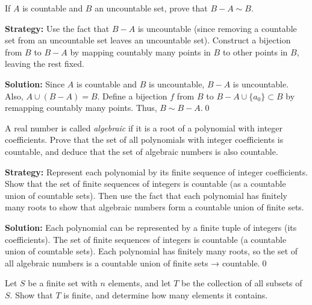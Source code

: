 \begin{problembox}
\begin{problemstatement}
If \( A \) is countable and \( B \) an uncountable set, prove that \( B - A \sim B \).
\end{problemstatement}
\end{problembox}

\noindent\textbf{Strategy:} Use the fact that $B - A$ is uncountable (since removing a countable set from an uncountable set leaves an uncountable set). Construct a bijection from $B$ to $B - A$ by mapping countably many points in $B$ to other points in $B$, leaving the rest fixed.

\noindent\bigskip\noindent\textbf{Solution:}  
Since \( A \) is countable and \( B \) is uncountable, \( B - A \) is uncountable.  
Also, \( A \cup (B - A) = B \). Define a bijection \( f \) from \( B \) to \( B - A \cup \{a_0\} \subset B \) by remapping countably many points.  
Thus, \( B \sim B - A \).\qed



\begin{problembox}
\begin{problemstatement}
A real number is called \emph{algebraic} if it is a root of a polynomial with integer coefficients.  
Prove that the set of all polynomials with integer coefficients is countable, and deduce that the set of algebraic numbers is also countable.
\end{problemstatement}
\end{problembox}

\noindent\textbf{Strategy:} Represent each polynomial by its finite sequence of integer coefficients. Show that the set of finite sequences of integers is countable (as a countable union of countable sets). Then use the fact that each polynomial has finitely many roots to show that algebraic numbers form a countable union of finite sets.

\bigskip\noindent\textbf{Solution:}  
Each polynomial can be represented by a finite tuple of integers (its coefficients). The set of finite sequences of integers is countable (a countable union of countable sets).  
Each polynomial has finitely many roots, so the set of all algebraic numbers is a countable union of finite sets → countable.\qed



\begin{problembox}
\begin{problemstatement}
Let \( S \) be a finite set with \( n \) elements, and let \( T \) be the collection of all subsets of \( S \).  
Show that \( T \) is finite, and determine how many elements it contains.
\end{problemstatement}
\end{problembox}

